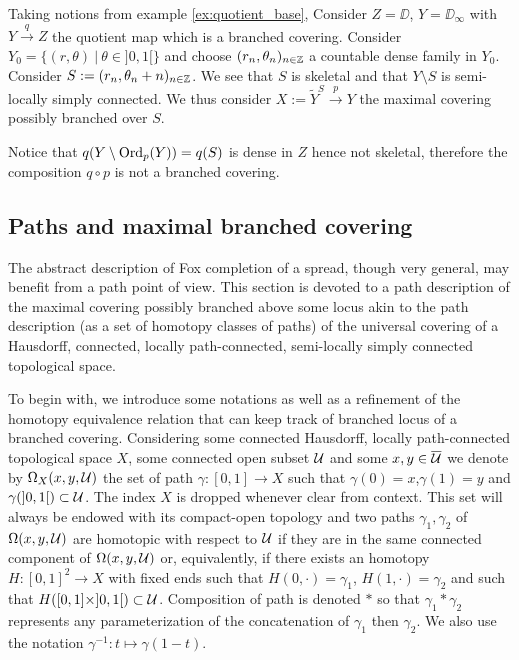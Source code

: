 \begin{cex}

Taking notions from example \ref{ex:quotient_base},  Consider $Z=\DD$, $Y=\DD_\infty$ with $Y\xrightarrow{q} Z$ the quotient map which is a branched covering. Consider $Y_0 = \{(r,\theta) ~|~ \theta \in ]0,1[\}$ and choose $(r_n,\theta_n)_{n\in \mathbb{Z}}$ a countable dense family in $Y_0$. Consider $S := (r_n,\theta_n+n)_{n\in \mathbb{Z}}$. We see that $S$ is skeletal and that $Y\setminus S$ is semi-locally simply connected. We thus consider $X:= \widetilde Y^{S} \xrightarrow{p} Y$ the maximal covering possibly branched over $S$. 

Notice that $q(Y\setminus \mathrm{Ord}_p(Y)) = q(S)$ is dense in $Z$ hence not skeletal, therefore the composition $q\circ p$ is not a branched covering. 
\end{cex}


\subsection{Paths and maximal branched covering}\label{sec:maximal_branched_path}
The abstract description of Fox completion of a spread, though very general,
may benefit from a path point of view.
This section is devoted to a path description 
of the maximal covering possibly branched above some locus akin to 
the path description (as a set of homotopy classes of paths)
of the universal covering of a Hausdorff, connected, locally path-connected,
semi-locally simply connected topological space. 

To begin with, we introduce some notations as well as a refinement of the
homotopy equivalence relation that can keep track of branched locus of a branched covering.
Considering some connected Hausdorff, locally path-connected topological space $X$, 
some connected open subset $\mathcal{U}$ and some $x,y\in \overline{\mathcal{U}}$ we denote by
$\Omega_X(x,y,\mathcal{U})$ the set of path $\gamma:[0,1]\rightarrow X$ such that
$\gamma(0)=x$,$\gamma(1)=y$ and $\gamma(]0,1[)\subset \mathcal{U}$. The index $X$ is dropped whenever clear from context. 
This set will always be endowed with its compact-open topology and two paths 
$\gamma_1,\gamma_2$ of $\Omega(x,y,\mathcal{U})$ are homotopic with respect to $\mathcal{U}$ if they are in the same connected component of $\Omega(x,y,\mathcal{U})$ or, equivalently, if there exists an homotopy $H:[0,1]^2\rightarrow X$ with fixed ends such that $H(0,\cdot)=\gamma_1$, $H(1,\cdot)=\gamma_2$ and such that $H([0,1]\times ]0,1[)\subset \mathcal{U}$. 
Composition of path is denoted $*$ so that $\gamma_1*\gamma_2$ represents any parameterization of the concatenation of $\gamma_1$ then $\gamma_2$. We also use the notation ${\gamma}^{-1}:t\mapsto \gamma(1-t)$.

